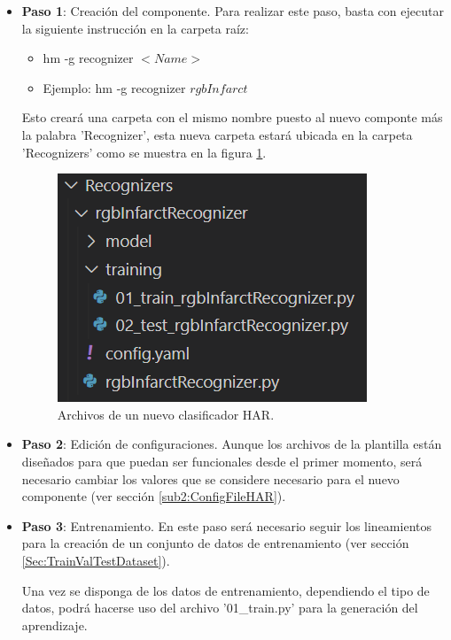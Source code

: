         \begin{itemize}
            \item \textbf{Paso 1}: Creación del componente. Para realizar este paso, basta con ejecutar la siguiente instrucción en la carpeta raíz:
            \begin{itemize}
                \item hm -g recognizer \textit{$<Name>$}
                \item Ejemplo: hm -g recognizer \textit{$rgbInfarct$}
            \end{itemize}
            Esto creará una carpeta con el mismo nombre puesto al nuevo componte más la palabra 'Recognizer', esta nueva carpeta estará ubicada en la carpeta 'Recognizers' como se muestra en la figura \ref{fig:NewHAR}.
    
            \begin{figure}[ht!]
            	\centering
            	\includegraphics[width=0.4\linewidth]{imgs/03-Architecture/03-NewHAR.png}
            	\caption[Archivos de un nuevo clasificador HAR]{Archivos de un nuevo clasificador HAR.}
        	    \label{fig:NewHAR}
            \end{figure}%
            
            \item \textbf{Paso 2}: Edición de configuraciones. Aunque los archivos de la plantilla están diseñados para que puedan ser funcionales desde el primer momento, será necesario cambiar los valores que se considere necesario para el nuevo componente (ver sección \ref{sub2:ConfigFileHAR}).
            
            \item \textbf{Paso 3}: Entrenamiento. En este paso será necesario seguir los lineamientos para la creación de un conjunto de datos de entrenamiento (ver sección \ref{Sec:TrainValTestDataset}).
            
            Una vez se disponga de los datos de entrenamiento, dependiendo el tipo de datos, podrá hacerse uso del archivo '01\_train.py' para la generación del aprendizaje. 
            

\end{itemize}
